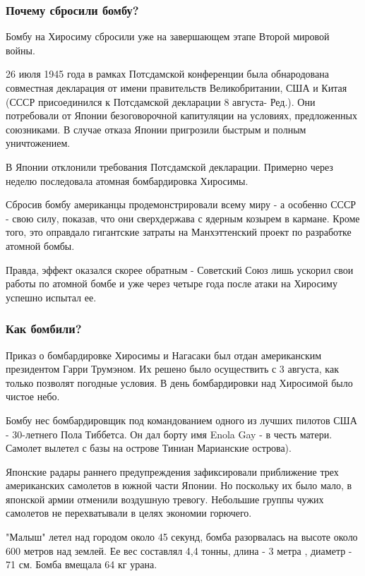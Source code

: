 \documentclass[a4paper,11pt]{extreport}
\begin{document}
\subsubsection{Почему сбросили бомбу?}

Бомбу на Хиросиму сбросили уже на завершающем этапе Второй мировой войны.

26 июля 1945 года в рамках Потсдамской конференции была обнародована
совместная декларация от имени правительств Великобритании, США и Китая (СССР
присоединился к Потсдамской декларации 8 августа- Ред.). Они потребовали от
Японии безоговорочной капитуляции на условиях, предложенных союзниками. В
случае отказа Японии пригрозили быстрым и полным уничтожением.

В Японии отклонили требования Потсдамской декларации. Примерно через неделю
последовала атомная бомбардировка Хиросимы. 

Сбросив бомбу американцы продемонстрировали всему миру - а особенно СССР - свою
силу, показав, что они сверхдержава с ядерным козырем в кармане. Кроме того,
это оправдало гигантские затраты на Манхэттенский проект по разработке атомной
бомбы. 

Правда, эффект оказался скорее обратным - Советский Союз лишь ускорил свои
работы по атомной бомбе и уже через четыре года после атаки на Хиросиму успешно
испытал ее. 

\subsubsection{Как бомбили?}

Приказ о бомбардировке Хиросимы и Нагасаки был отдан американским президентом
Гарри Трумэном. Их решено было осуществить с 3 августа, как только позволят
погодные условия. В день бомбардировки над Хиросимой было чистое небо.

Бомбу нес бомбардировщик под командованием одного из лучших пилотов США -
30-летнего Пола Тиббетса. Он дал борту имя Enola Gay  - в честь матери. Самолет
вылетел с базы на острове Тиниан Марианские острова).

Японские радары раннего предупреждения зафиксировали приближение трех
американских самолетов в южной части Японии. Но поскольку их было мало, в
японской армии отменили воздушную тревогу. Небольшие группы чужих самолетов не
перехватывали в целях экономии горючего.

"Малыш" летел над городом около 45 секунд, бомба разорвалась на высоте около
600 метров над землей. Ее вес составлял 4,4 тонны, длина - 3 метра , диаметр -
71 см. Бомба вмещала 64 кг урана.
\end{document}

